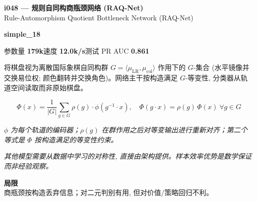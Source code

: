 \documentclass[10pt,a4paper]{article}
\newcommand{\pillsi}[0]{\colorbox{s18redbg}{\strut\textcolor{s18red}{\scriptsize\bfseries\sffamily simple\_18}}}
\begin{document}
\begin{tcolorbox}
\begin{tcolorbox}[archhead, boxsep=0pt, top=4pt, bottom=4pt]
\textcolor{deepforest}{\sffamily\bfseries\large i048 --- 规则自同构商瓶颈网络 (RAQ-Net)} \\[2pt]
{\color{muted}\small Rule-Automorphism Quotient Bottleneck Network (RAQ-Net)}
\\[1pt]\textcolor{muted}{\sffamily\scriptsize \pillsi{}\quad 参数量 \textbf{179k}\quad 速度 \textbf{12.0k/s}\quad 测试 PR AUC \textbf{0.861}}
\end{tcolorbox}
\smallskip
将棋盘视为离散国际象棋自同构群 $G = \langle\mu_{\mathrm{LR}}, \mu_{\mathrm{col}}\rangle$ 作用下的 $G$-集合 (水平镜像并交换易位权; 颜色翻转并交换角色)。网络主干按构造满足 $G$-等变性, 分类器从轨道空间读取而非原始棋盘。
\par\smallskip
\begin{equation*}
\Phi(x) = \frac{1}{|G|} \sum_{g \in G} \rho(g) \cdot \phi(g^{-1}\cdot x), \quad \Phi(g\cdot x) = \rho(g)\,\Phi(x)\ \forall g \in G
\end{equation*}
\par\vspace{-4pt}\begin{center}\textit{\textcolor{muted}{\small $\phi$ 为每个轨道的编码器；$\rho(g)$ 在群作用之后对等变输出进行重新对齐；第二个等式是 $\Phi$ 按构造满足的等变性约束。}}\end{center}
\par\smallskip{\color{forest}\sffamily\bfseries\textgreater\,}\textit{其他模型需要从数据中学习的对称性, 直接由架构提供。样本效率优势是数学保证而非经验观察。}
\par\smallskip\textbf{\sffamily\footnotesize\color{muted}局限}\\
商瓶颈按构造丢弃信息；对二元判别有用, 但对价值/策略回归不利。
\end{tcolorbox}
\end{document}
